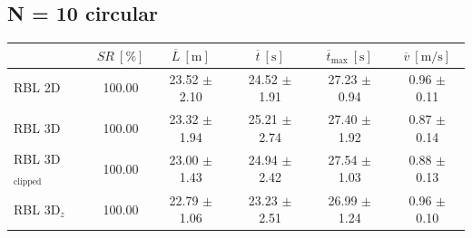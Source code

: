         \subsection{N = 10 circular}
            \begin{table}[H]
                \centering
                \renewcommand{\arraystretch}{1.2}
                \begin{tabular}{|l|c|c|c|c|c|}
                \hline
                                            & \( SR \ [\%] \) & \( \overline{L} \ [\mathrm{m}] \) & \( \overline{t} \ [\mathrm{s}] \) & \( \overline{t}_{\text{max}} \ [\mathrm{s}] \) & \( \overline{v} \ [\mathrm{m/s}] \)     \\ \hline
                RBL 2D                      & 100.00          & 23.52 $\pm$ 2.10                  & 24.52 $\pm$ 1.91                  & 27.23 $\pm$ 0.94                               & 0.96 $\pm$ 0.11                         \\ \hline
                RBL 3D                      & 100.00          & 23.32 $\pm$ 1.94                  & 25.21 $\pm$ 2.74                  & 27.40 $\pm$ 1.92                               & 0.87 $\pm$ 0.14                         \\ \hline
                RBL 3D\(_{\text{clipped}}\) & 100.00          & 23.00 $\pm$ 1.43                  & 24.94 $\pm$ 2.42                  & 27.54 $\pm$ 1.03                               & 0.88 $\pm$ 0.13                         \\ \hline
                RBL 3D\(_z\)                & 100.00          & 22.79 $\pm$ 1.06                  & 23.23 $\pm$ 2.51                  & 26.99 $\pm$ 1.24                               & 0.96 $\pm$ 0.10                         \\ \hline
                \end{tabular}
            \end{table}
        

